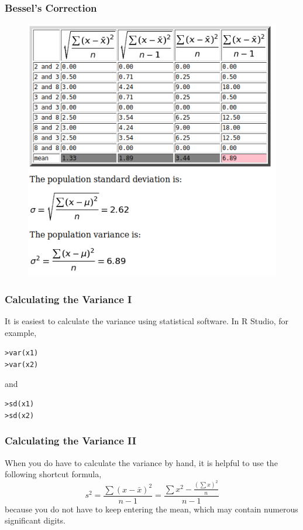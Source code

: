 \documentclass[xcolor=dvipsnames]{beamer}
\begin{document}
\begin{frame}
  \frametitle{Bessel's Correction}
\begin{figure}[h]
\includegraphics[scale=.45]{./diagrams/bessel.png}
\end{figure}
\end{frame}

\begin{frame}
  \frametitle{Calculating the Variance I}
It is easiest to calculate the variance using statistical software. In
R Studio, for example,
\begin{alltt}
> var(x1)\newline
> var(x2)
\end{alltt}
and
\begin{alltt}
> sd(x1)\newline
> sd(x2)
\end{alltt}
\end{frame}

\begin{frame}
  \frametitle{Calculating the Variance II}
When you do have to calculate the variance by hand, it is helpful to
use the following shortcut formula,
\begin{equation}
  \label{eq:eecheaxe}
s^{2}=\frac{\sum(x-\bar{x})^{2}}{n-1}=\frac{\sum{}x^{2}-\frac{\left(\sum{}x\right)^{2}}{n}}{n-1}
\end{equation}
because you do not have to keep entering the mean, which may contain
numerous significant digits.
\end{frame}
\end{document}
